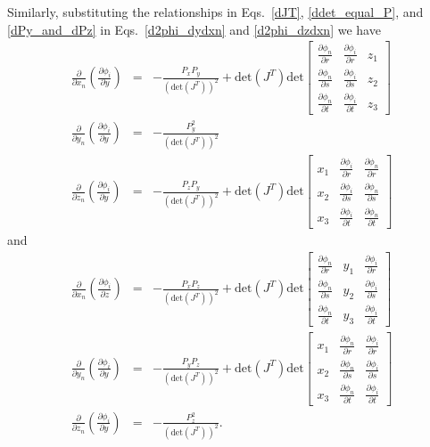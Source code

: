 Similarly, substituting the relationships in Eqs.\ \eqref{dJT}, \eqref{ddet_equal_P}, and \eqref{dPy_and_dPz} in Eqs.\ \eqref{d2phi_dydxn} and \eqref{d2phi_dzdxn} we have
%
\begin{eqnarray}
\frac{\partial}{\partial x_n} \left( \frac{\partial \phi_i}{\partial y} \right) &=&  -\frac{P_x P_y}{(\text{det}(J^T))^2} + \text{det}(J^T) \text{det} \begin{bmatrix}
\frac{\partial \phi_n}{\partial r} & \frac{\partial \phi_i}{\partial r} & z_1 \\
\frac{\partial \phi_n}{\partial s} & \frac{\partial \phi_i}{\partial s} & z_2 \\
\frac{\partial \phi_n}{\partial t} & \frac{\partial \phi_i}{\partial t} & z_3 
\end{bmatrix} \nonumber\\
\frac{\partial}{\partial y_n} \left( \frac{\partial \phi_i}{\partial y} \right) &=& -\frac{P_y^2}{(\text{det}(J^T))^2}  \nonumber\\
\frac{\partial}{\partial z_n} \left( \frac{\partial \phi_i}{\partial y} \right) &=& -\frac{P_z P_y}{(\text{det}(J^T))^2} + \text{det}(J^T) \text{det} \begin{bmatrix}
x_1 & \frac{\partial \phi_i}{\partial r} & \frac{\partial \phi_n}{\partial r} \\
x_2 & \frac{\partial \phi_i}{\partial s} & \frac{\partial \phi_n}{\partial s} \\
x_3 & \frac{\partial \phi_i}{\partial t} & \frac{\partial \phi_n}{\partial t} 
\end{bmatrix} 
\label{dkdy}
\end{eqnarray}
%
and
%
\begin{eqnarray}
\frac{\partial}{\partial x_n} \left( \frac{\partial \phi_i}{\partial z} \right) &=&  -\frac{P_x P_z}{(\text{det}(J^T))^2} + \text{det}(J^T) \text{det} \begin{bmatrix}
\frac{\partial \phi_n}{\partial r} & y_1 & \frac{\partial \phi_i}{\partial r}  \\
\frac{\partial \phi_n}{\partial s} & y_2 & \frac{\partial \phi_i}{\partial s} \\
\frac{\partial \phi_n}{\partial t} & y_3 & \frac{\partial \phi_i}{\partial t}  
\end{bmatrix} \nonumber\\
\frac{\partial}{\partial y_n} \left( \frac{\partial \phi_i}{\partial y} \right) &=& -\frac{P_y P_z}{(\text{det}(J^T))^2} + \text{det}(J^T)\text{det} \begin{bmatrix}
x_1 & \frac{\partial \phi_n}{\partial r} &  \frac{\partial \phi_i}{\partial r}  \\
x_2 & \frac{\partial \phi_n}{\partial s} &  \frac{\partial \phi_i}{\partial s} \\
x_3 & \frac{\partial \phi_n}{\partial t} &  \frac{\partial \phi_i}{\partial t}  
\end{bmatrix} \nonumber\\
\frac{\partial}{\partial z_n} \left( \frac{\partial \phi_i}{\partial y} \right) &=& -\frac{P_z^2 }{(\text{det}(J^T))^2} .
\label{dkdz}
\end{eqnarray}
